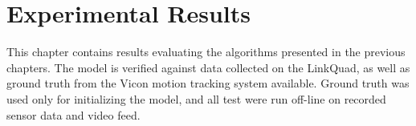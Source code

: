 \chapter{Experimental Results}
\label{cha:results}
    This chapter contains results evaluating the algorithms presented in the previous chapters.
    The model is verified against data collected on the LinkQuad, as well
    as ground truth from the Vicon motion tracking system available.
    Ground truth was used only for initializing the model, and all test
    were run off-line on recorded sensor data and video feed.

    
    
    
    



